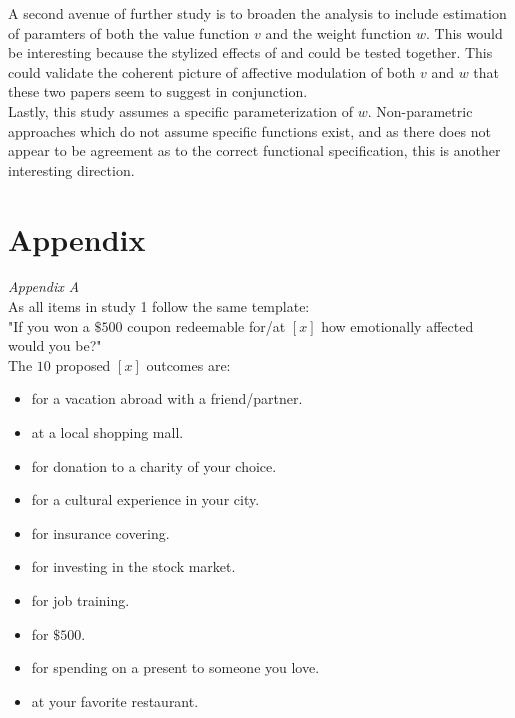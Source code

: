 \documentclass[12pt]{article}
\begin{document}
A second avenue of further study is to broaden
the analysis to include estimation of paramters
of both the value function $v$ and the weight
function  $w$. This would be interesting because
the stylized effects of \textcite{
rottenstreich2001money} and \textcite{hsee2004music}
could be tested together. This could validate
the coherent picture of affective modulation
of both $v$ and  $w$ that
these two papers seem to suggest in
conjunction. \\

Lastly, this study assumes
a specific parameterization of $w$.
Non-parametric approaches which do not assume
specific functions exist, and as there does not
appear to be agreement as to the correct functional
specification, this is another interesting
direction.

\printbibliography
\section{Appendix}

\emph{Appendix A} \\
As all items in study 1 follow the same template: \\

"If you won a $\$500$ coupon redeemable for/at
$[x]$ how emotionally affected would you be?" \\

The $10$ proposed $[x]$ outcomes are:
\begin{itemize}
	\item for a vacation abroad with a friend/partner.
	\item at a local shopping mall.
	\item for donation to a charity of your choice.
	\item for a cultural experience in your city.
	\item for insurance covering.
	\item for investing in the stock market.
	\item for job training.
	\item for $\$500$.
	\item for spending on a present to someone you love.
	\item at your favorite restaurant.
\end{itemize}
\end{document}
